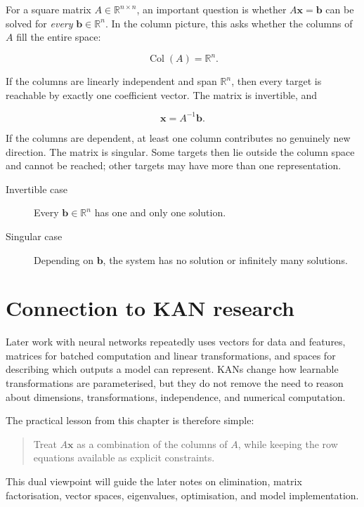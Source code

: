 For a square matrix \(A\in\mathbb{R}^{n\times n}\), an important question is
whether \(A\mathbf{x}=\mathbf{b}\) can be solved for \emph{every}
\(\mathbf{b}\in\mathbb{R}^{n}\). In the column picture, this asks whether the
columns of \(A\) fill the entire space:

\[
    \operatorname{Col}(A)=\mathbb{R}^{n}.
\]

If the columns are linearly independent and span \(\mathbb{R}^{n}\), then
every target is reachable by exactly one coefficient vector. The matrix is
invertible, and

\[
    \mathbf{x}=A^{-1}\mathbf{b}.
\]

If the columns are dependent, at least one column contributes no genuinely new
direction. The matrix is singular. Some targets then lie outside the column
space and cannot be reached; other targets may have more than one
representation.

\begin{description}
    \item[Invertible case] Every \(\mathbf{b}\in\mathbb{R}^{n}\) has one and
    only one solution.
    \item[Singular case] Depending on \(\mathbf{b}\), the system has no
    solution or infinitely many solutions.
\end{description}

\section{Connection to KAN research}

Later work with neural networks repeatedly uses vectors for data and features,
matrices for batched computation and linear transformations, and spaces for
describing which outputs a model can represent. KANs change how learnable
transformations are parameterised, but they do not remove the need to reason
about dimensions, transformations, independence, and numerical computation.

The practical lesson from this chapter is therefore simple:

\begin{quote}
Treat \(A\mathbf{x}\) as a combination of the columns of \(A\), while keeping
the row equations available as explicit constraints.
\end{quote}

This dual viewpoint will guide the later notes on elimination, matrix
factorisation, vector spaces, eigenvalues, optimisation, and model
implementation.
